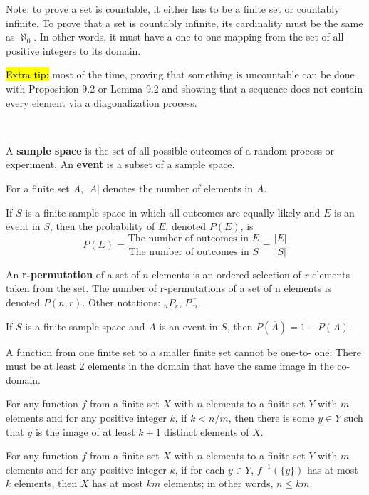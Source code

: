 \documentclass{article}
\begin{document}
\begin{description}
	\item \qquad Note: to prove a set is countable, it either has to be a finite set or countably infinite. To prove that a set is countably infinite, its cardinality must be the same as $\aleph_{0}$. In other words, it must have a one-to-one mapping from the set of all positive integers to its domain.
	\item \qquad \hl{Extra tip:} most of the time, proving that something is uncountable can be done with Proposition 9.2 or Lemma 9.2 and showing that a sequence does not contain every element via a diagonalization process.

	\vspace{0.2cm}
    \item[\large Counting]\
    \item[Sample Space] A \textbf{sample space} is the set of all possible outcomes of a random process or experiment. An \textbf{event} is a subset of a sample space.
   \item[Notation]For a finite set $A$, $|A|$ denotes the number of elements in $A$.
   \item[Equally Likely Probability Formula] If $S$ is a finite sample space in which all outcomes are equally likely and $E$ is an event in $S$, then the probability of $E$, denoted $P(E)$, is \[P(E) = \frac{\text{The number of outcomes in }E}{\text{The number of outcomes in }S}=\frac{|E|}{|S|}\]
   \item[r-permutation] An \textbf{r-permutation} of a set of $n$ elements is an ordered
selection of $r$ elements taken from the set. The number of r-permutations of a set of n elements
is denoted $P(n, r)$. Other notations: $_{n}P_{r}$, $P_{\;n}^{\;r}$.
\item[Formula for the Probability of the Complement of an Event]If $S$ is a finite sample space and $A$ is an event in $S$, then $P(\overline{A}) = 1-P(A)$.
	\item[Pigeonhole Principle (PHP)] A function from one finite set to a smaller finite set cannot be one-to- one: There must be at least 2 elements in the domain that have the same image in the co-domain.
	\item[Generalized Pigeonhole Principle]For any function $f$ from a finite set $X$ with $n$ elements to a finite set $Y$ with $m$ elements and for any positive integer $k$, if $k < n/m$, then there is some $y\in Y$ such that $y$ is the image of at least $k + 1$ distinct elements of $X$.
	\item[Generalized Pigeonhole Principle (Contrapositive Form)]For any function $f$ from a finite set $X$ with $n$ elements to a finite set $Y$ with $m$ elements and for any positive integer $k$, if for each $y\in Y$, $f^{-1}(\{y\})$ has at most $k$ elements, then $X$ has at most $km$ elements; in other words, $n\leq km$.

\end{description}
\end{document}
